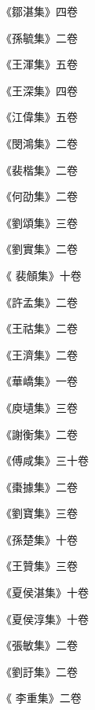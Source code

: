 \begin{pinyinscope}
 《鄒湛集》四卷



 《孫毓集》二卷



 《王渾集》五卷



 《王深集》四卷



 《江偉集》五卷



 《閔鴻集》二卷



 《裴楷集》二卷



 《何劭集》二卷



 《劉頌集》三卷



 《劉實集》二卷



 《
 裴頠集》十卷



 《許孟集》二卷



 《王祜集》二卷



 《王濟集》二卷



 《華嶠集》一卷



 《庾壝集》三卷



 《謝衡集》二卷



 《傅咸集》三十卷



 《棗據集》二卷



 《劉寶集》三卷



 《孫楚集》十卷



 《王贊集》三卷



 《夏侯湛集》十卷



 《夏侯淳集》十卷



 《張敏集》二卷



 《劉訏集》二卷



 《
 李重集》二卷




\end{pinyinscope}
